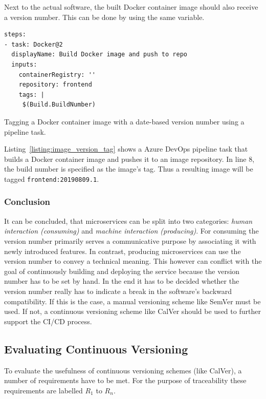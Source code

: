 Next to the actual software, the built Docker container image should also
receive a version number. This can be done by using the same variable.

\begin{listing}[H]
  \begin{verbatim}
steps:
- task: Docker@2
  displayName: Build Docker image and push to repo
  inputs:
    containerRegistry: ''
    repository: frontend
    tags: |
     $(Build.BuildNumber)
  \end{verbatim}
  \caption{Tagging a Docker container image with a date-based version number
  using a pipeline task.}%
  \label{listing:image_version_tag}
\end{listing}

Listing~\ref{listing:image_version_tag} shows a Azure DevOps pipeline task that
builds a Docker container image and pushes it to an image repository. In line
8, the build number is specified as the image's tag. Thus a resulting image
will be tagged \texttt{frontend:20190809.1}.

\subsubsection{Conclusion}%
\label{ssub:Conclusion}
It can be concluded, that microservices can be split into two categories:
\textit{human interaction (consuming)} and \textit{machine interaction
(producing)}. For consuming the version number primarily serves a communicative
purpose by associating it with newly introduced features. In contrast,
producing microservices can use the version number to convey a technical
meaning. This however can conflict with the goal of continuously building and
deploying the service because the version number has to be set by hand. In the
end it has to be decided whether the version number really has to indicate a
break in the software's backward compatibility. If this is the case, a manual
versioning scheme like SemVer must be used. If not, a continuous versioning
scheme like CalVer should be used to further support the \ac{CI}/\ac{CD}
process.

\subsection{Evaluating Continuous Versioning}%
\label{sub:Evaluating_Continuous_Versioning}
To evaluate the usefulness of continuous versioning schemes (like CalVer), a
number of requirements have to be met. For the purpose of traceability these
requirements are labelled $R_1$ to $R_n$.

